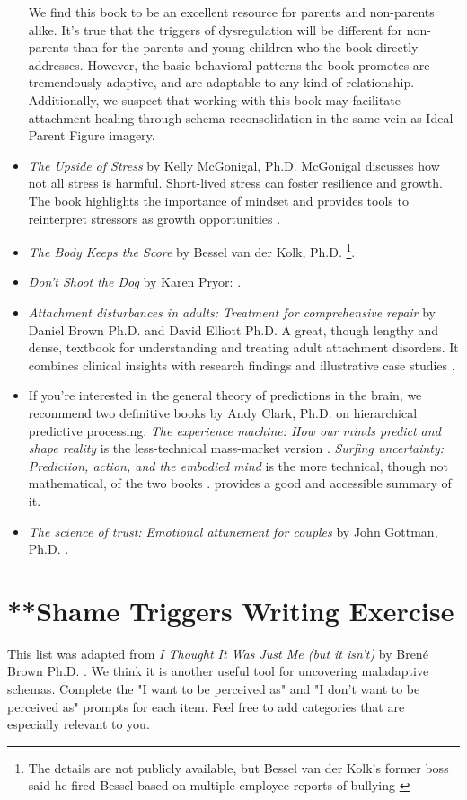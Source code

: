 \documentclass[12pt,letterpaper]{book}
\begin{document}
\begin{itemize}
    We find this book to be an excellent resource for parents and non-parents alike. It's true that the triggers of dysregulation will be different for non-parents than for the parents and young children who the book directly addresses. However, the basic behavioral patterns the book promotes are tremendously adaptive, and are adaptable to any kind of relationship. Additionally, we suspect that working with this book may facilitate attachment healing through schema reconsolidation in the same vein as Ideal Parent Figure imagery.
    \item \textit{The Upside of Stress} by Kelly McGonigal, Ph.D. McGonigal discusses how not all stress is harmful. Short-lived stress can foster resilience and growth. The book highlights the importance of mindset and provides tools to reinterpret stressors as growth opportunities \cite{mcgonigalStress}.
    \item \textit{The Body Keeps the Score} by Bessel van der Kolk, Ph.D. \cite{vanderKolkBody} \footnote{The details are not publicly available, but Bessel van der Kolk's former boss said he fired Bessel based on multiple employee reports of bullying \cite{besselMisconduct}}.
    \item \textit{Don't Shoot the Dog} by Karen Pryor:  \cite{pryorDog}.
    \item \textit{Attachment disturbances in adults: Treatment for comprehensive repair} by Daniel Brown Ph.D. and David Elliott Ph.D. A great, though lengthy and dense, textbook for understanding and treating adult attachment disorders. It combines clinical insights with research findings and illustrative case studies \cite{brownAttachmentDisturbances}.
    \item If you're interested in the general theory of predictions in the brain, we recommend two definitive books by Andy Clark, Ph.D. on hierarchical predictive processing. \textit{The experience machine: How our minds predict and shape reality} is the less-technical mass-market version \cite{clark2024experience}. \textit{Surfing uncertainty: Prediction, action, and the embodied mind} is the more technical, though not mathematical, of the two books \cite{clark2015surfing}. \textcite{alexanderSurfing} provides a good and accessible summary of it.
    \item \textit{The science of trust: Emotional attunement for couples} by John Gottman, Ph.D.  \cite{gottmanTrust}.
\end{itemize}
\chapter{**Shame Triggers Writing Exercise}
\label{sec:shametriggers}
This list was adapted from \textit{I Thought It Was Just Me (but it isn't)} by Brené Brown Ph.D. \cite{brownThought}. We think it is another useful tool for uncovering maladaptive schemas. Complete the "I want to be perceived as" and "I don't want to be perceived as" prompts for each item. Feel free to add categories that are especially relevant to you.
\end{document}
